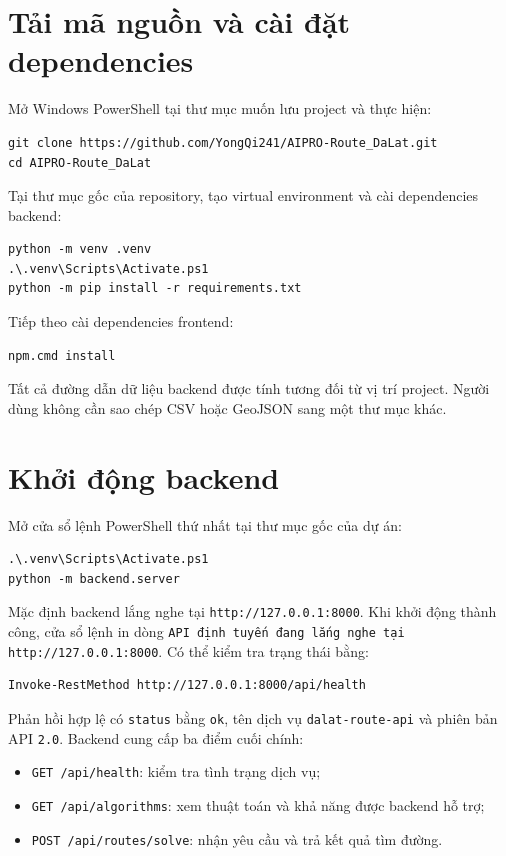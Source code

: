 \section{Tải mã nguồn và cài đặt dependencies}

Mở Windows PowerShell tại thư mục muốn lưu project và thực hiện:

\begin{verbatim}
git clone https://github.com/YongQi241/AIPRO-Route_DaLat.git
cd AIPRO-Route_DaLat
\end{verbatim}

Tại thư mục gốc của repository, tạo virtual environment và cài dependencies
backend:

\begin{verbatim}
python -m venv .venv
.\.venv\Scripts\Activate.ps1
python -m pip install -r requirements.txt
\end{verbatim}

Tiếp theo cài dependencies frontend:

\begin{verbatim}
npm.cmd install
\end{verbatim}

Tất cả đường dẫn dữ liệu backend được tính tương đối từ vị trí project. Người
dùng không cần sao chép CSV hoặc GeoJSON sang một thư mục khác.

\section{Khởi động backend}

Mở cửa sổ lệnh PowerShell thứ nhất tại thư mục gốc của dự án:

\begin{verbatim}
.\.venv\Scripts\Activate.ps1
python -m backend.server
\end{verbatim}

Mặc định backend lắng nghe tại \texttt{http://127.0.0.1:8000}. Khi khởi động
thành công, cửa sổ lệnh in dòng \texttt{API định tuyến đang lắng nghe tại
http://127.0.0.1:8000}. Có thể kiểm tra trạng thái bằng:

\begin{verbatim}
Invoke-RestMethod http://127.0.0.1:8000/api/health
\end{verbatim}

Phản hồi hợp lệ có \texttt{status} bằng \texttt{ok}, tên dịch vụ
\texttt{dalat-route-api} và phiên bản API \texttt{2.0}. Backend cung cấp ba
điểm cuối chính:

\begin{itemize}[itemsep=2pt]
  \item \texttt{GET /api/health}: kiểm tra tình trạng dịch vụ;
  \item \texttt{GET /api/algorithms}: xem thuật toán và khả năng được backend
  hỗ trợ;
  \item \texttt{POST /api/routes/solve}: nhận yêu cầu và trả kết quả tìm đường.
\end{itemize}

